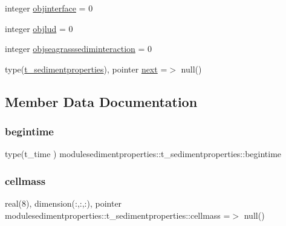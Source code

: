 \begin{DoxyCompactItemize}
\item 
integer \mbox{\hyperlink{structmodulesedimentproperties_1_1t__sedimentproperties_a940cc4ca421b134ab9b1f82b325f4e6c}{objinterface}} = 0
\item 
integer \mbox{\hyperlink{structmodulesedimentproperties_1_1t__sedimentproperties_a98fcbe3da8148b8ab522c3df1b950b4e}{objlud}} = 0
\item 
integer \mbox{\hyperlink{structmodulesedimentproperties_1_1t__sedimentproperties_a77d947aa41454a47c891732933e0b119}{objseagrasssediminteraction}} = 0
\item 
type(\mbox{\hyperlink{structmodulesedimentproperties_1_1t__sedimentproperties}{t\+\_\+sedimentproperties}}), pointer \mbox{\hyperlink{structmodulesedimentproperties_1_1t__sedimentproperties_a4643c5bfeefb23b8949e04cd9bb0b912}{next}} =$>$ null()
\end{DoxyCompactItemize}


\subsection{Member Data Documentation}
\mbox{\label{structmodulesedimentproperties_1_1t__sedimentproperties_addaf39d2cb2199bf5a29be78c0f8e9a3}} 
\subsubsection{\texorpdfstring{begintime}{begintime}}
{\footnotesize\ttfamily type(t\+\_\+time ) modulesedimentproperties\+::t\+\_\+sedimentproperties\+::begintime\hspace{0.3cm}{\ttfamily [private]}}

\mbox{\label{structmodulesedimentproperties_1_1t__sedimentproperties_ae72f10544966aa3cf81b7e80a94e813e}} 
\subsubsection{\texorpdfstring{cellmass}{cellmass}}
{\footnotesize\ttfamily real(8), dimension(\+:,\+:,\+:), pointer modulesedimentproperties\+::t\+\_\+sedimentproperties\+::cellmass =$>$ null()\hspace{0.3cm}{\ttfamily [private]}}

